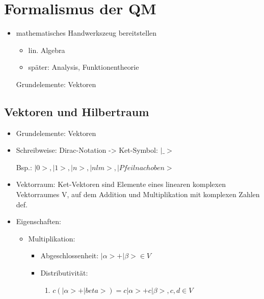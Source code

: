 \documentclass[11pt]{scrartcl} %
\begin{document}
 
 
 
 
 \section{Formalismus der QM}
 \label{sec:formalismus}
 
 \begin{itemize}
  \item mathematisches Handwerkszeug bereitstellen
  
  \begin{itemize}
   \item lin. Algebra
   \item später: Analysis, Funktionentheorie
  \end{itemize}
  
  Grundelemente: Vektoren

 \end{itemize}
 
 
 
 \subsection{Vektoren und Hilbertraum}
 
 \begin{itemize}
  \item Grundelemente: Vektoren
  \item Schreibweise: Dirac-Notation -> Ket-Symbol: $| \_ > $
  
  Bsp.: $|0>, |1>, |n>, |nlm>, | Pfeil nach oben >$
  
  \item Vektorraum: Ket-Vektoren sind Elemente eines linearen komplexen
  Vektorraumes V, auf dem Addition und Multiplikation mit komplexen Zahlen def.
  
  \item Eigenschaften:
  
  \begin{itemize}
   \item Multiplikation:
   \begin{itemize}
    \item Abgeschlossenheit: $|\alpha> + |\beta> \in V$
    \item Distributivität:
    \begin{enumerate}
     \item $c ( |\alpha> + |beta> ) = c|\alpha> + c|\beta>, c,d \in V$
    \end{enumerate}

    
   \end{itemize}

  \end{itemize}

  
 \end{itemize}
\end{document}
